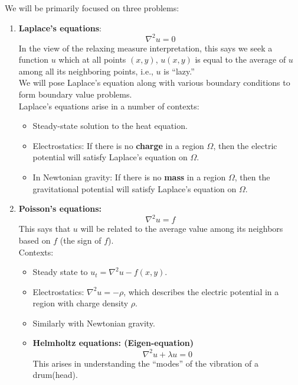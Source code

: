 \documentclass{book}
\theoremstyle{definition}
\begin{document}

We will be primarily focused on three problems:
\begin{enumerate}
	\item \textbf{Laplace's equations}: $$\boxed{\nabla^2 u = 0}$$ In the view of the relaxing measure interpretation, this says we seek a function $u$ which at all points $(x,y)$, $u(x,y)$ is equal to the average of $u$ among all its neighboring points, i.e., $u$ is ``lazy.''\\
	
	We will pose Laplace's equation along with various boundary conditions to form boundary value problems.\\
	
	Laplace's equations arise in a number of contexts:
	\begin{itemize}
		\item Steady-state solution to the heat equation.
		\item Electrostatics: If there is no \textbf{charge} in a region $\Omega$, then the electric potential will satisfy Laplace's equation on $\Omega$.
		\item In Newtonian gravity: If there is no \textbf{mass} in a region $\Omega$, then the gravitational potential will satisfy Laplace's equation on $\Omega$.
	\end{itemize}
	\item \textbf{Poisson's equations:} $$\boxed{ \nabla^2 u = f }$$ This says that $u$ will be related to the average value among its neighbors based on $f$ (the sign of $f$).\\
	
	Contexts:
	\begin{itemize}
		\item Steady state to $u_t = \nabla^2 u - f(x,y)$.
		\item Electrostatics: $\nabla^2 u = -\rho$, which describes the electric potential in a region with charge density $\rho$. 
		\item Similarly with Newtonian gravity.
		
	\item \textbf{Helmholtz equations: (Eigen-equation)}
	$$ \nabla^2 u + \lambda u = 0 $$
	This arises in understanding the ``modes'' of the vibration of a drum(head).
	\end{itemize}
\end{enumerate}
\end{document}
